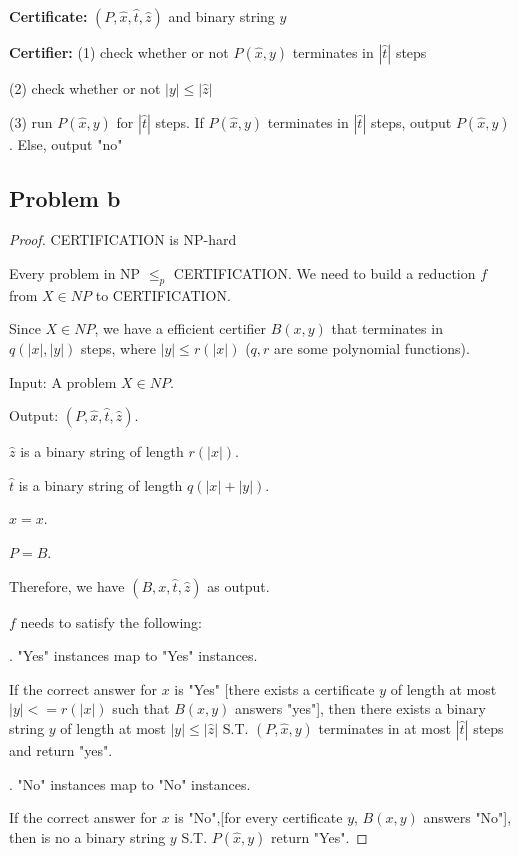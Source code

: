 \documentclass[openany]{article}
\begin{document}
\textbf{Certificate:} $(P, \hat{x}, \hat{t}, \hat{z})$ and binary string $y$

\textbf{Certifier:} 
(1) check whether or not $P(\hat{x},y)$ terminates in $|\hat{t}|$ steps

(2) check whether or not $|y| \leqslant |\hat{z}|$

(3) run $P(\hat{x},y)$ for $|\hat{t}|$ steps. If $P(\hat{x},y)$ terminates in $|\hat{t}|$ steps, output $P(\hat{x},y)$. Else, output "no"

\subsection*{Problem b}

\begin{proof}{CERTIFICATION is NP-hard}

Every problem in NP $\leqslant_p$ CERTIFICATION. We need to build a reduction $f$ from $X \in NP$ to CERTIFICATION.

Since $X\in NP$, we have a efficient certifier $B(x,y)$ that terminates in $q(|x|,|y|)$ steps, where $|y| \leqslant r(|x|)$ ($q, r$ are some polynomial functions).

Input: A problem $X\in NP$.

Output: $(P, \hat{x}, \hat{t}, \hat{z})$.

\qquad $\hat{z}$ is a binary string of length $r(|x|)$.

\qquad $\hat{t}$ is a binary string of length $q(|x|+|y|)$.

\qquad $\hat{x} = x$. 


\qquad $P=B$.

Therefore, we have $(B, x, \hat{t}, \hat{z})$ as output.

$f$ needs to satisfy the following:

. "Yes" instances map to "Yes" instances.

\qquad If the correct answer for $x$ is "Yes" [there exists a certificate $y$ of length at most $|y| <= r(|x|)$ such that $B(x,y)$ answers "yes"], then there exists a binary string $y$ of length at most $|y| \leqslant |\hat{z}|$ S.T. $(P, \hat{x}, y)$ terminates in at most $|\hat{t}|$ steps and return "yes".


. "No" instances map to "No" instances.

\qquad If the correct answer for $x$ is "No",[for every certificate $y$, $B(x,y)$ answers "No"], then is no a binary string $y$ S.T. $P(\hat{x},y)$ return "Yes".


\end{proof}
\end{document}
